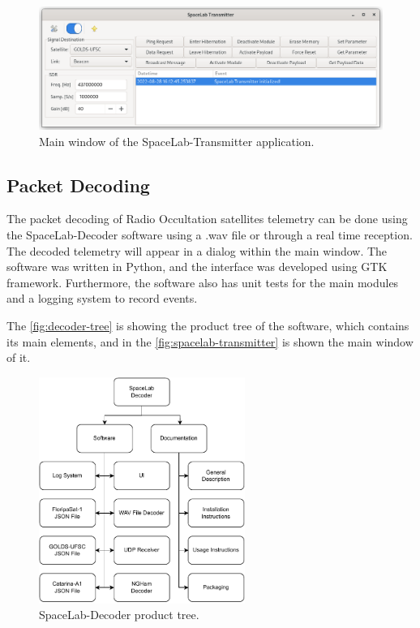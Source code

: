 \begin{figure}[!ht]
    \begin{center}
        \includegraphics[width=\textwidth]{figures/spacelab-transmitter-window.png}
        \caption{Main window of the SpaceLab-Transmitter application.}
        \label{fig:spacelab-transmitter}
    \end{center}
\end{figure}

\subsection{Packet Decoding}

The packet decoding of Radio Occultation satellites telemetry can be done using the SpaceLab-Decoder \cite{spacelab-decoder} software using a .wav file or through a real time reception. The decoded telemetry will appear in a dialog within the main window. The software was written in Python, and the interface was developed using GTK framework. Furthermore, the software also has unit tests for the main modules and a logging system to record events.

The \autoref{fig:decoder-tree} is showing the product tree of the software, which contains its main elements, and in the \autoref{fig:spacelab-transmitter} is shown the main window of it.

\begin{figure}[!ht]
    \begin{center}
        \includegraphics[width=0.6\textwidth]{figures/decoder_tree.pdf}
        \caption{SpaceLab-Decoder product tree.}
        \label{fig:decoder-tree}
    \end{center}
\end{figure}

